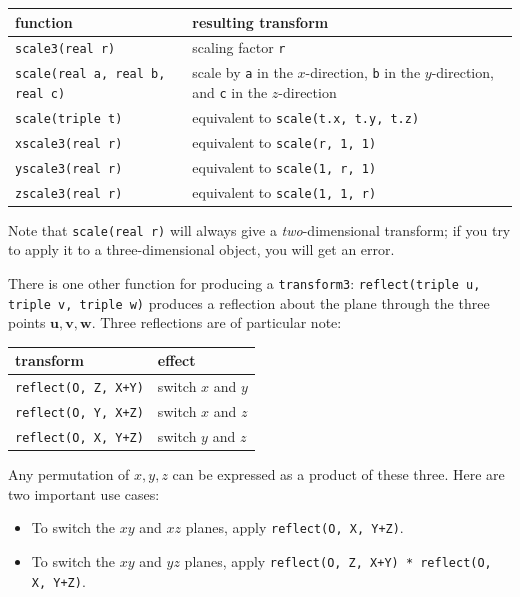 \documentclass{article}
\begin{document}
\begin{center}
\renewcommand{\arraystretch}{1.3}
\begin{tabular}{@{}p{4.2cm} p{5.4cm}@{}} \toprule
function & resulting transform \\ \midrule
\lstinline!scale3(real r)! & scaling factor \texttt{r} \\
\lstinline!scale(real a, real b, real c)! & scale by \texttt{a} in the $x$-direction, \texttt{b} in the $y$-direction, and 
\texttt{c} in the $z$-direction \\
\lstinline!scale(triple t)! & equivalent to \lstinline!scale(t.x, t.y, t.z)! \\
\lstinline!xscale3(real r)! & equivalent to \lstinline!scale(r, 1, 1)! \\
\lstinline!yscale3(real r)! & equivalent to \lstinline!scale(1, r, 1)! \\
\lstinline!zscale3(real r)! & equivalent to \lstinline!scale(1, 1, r)! \\
\bottomrule
\end{tabular}
\end{center}

\noindent
Note that \lstinline!scale(real r)! will always give a \emph{two}-dimensional transform;
if you try to apply it to a three-dimensional object, you will get an error.

There is one other function for producing a \lstinline!transform3!: 
\lstinline!reflect(triple u, triple v, triple w)! produces a reflection about the
plane through the three points $\mathbf{u}, \mathbf{v}, \mathbf{w}$.
Three reflections are of particular note:
\begin{center}
\renewcommand{\arraystretch}{1.3}
\begin{tabular}{@{}p{4.2cm} p{5.4cm}@{}} \toprule
transform & effect \\ \midrule
\lstinline!reflect(O, Z, X+Y)! & switch $x$ and $y$ \\
\lstinline!reflect(O, Y, X+Z)! & switch $x$ and $z$ \\
\lstinline!reflect(O, X, Y+Z)! & switch $y$ and $z$
\end{tabular}
\end{center}

Any permutation of $x, y, z$ can be expressed as a product of these three.
Here are two important use cases:\label{switchplanes}
\begin{itemize}
\item To switch the $xy$ and $xz$ planes, apply \lstinline!reflect(O, X, Y+Z)!.
\item To switch the $xy$ and $yz$ planes, apply 
\lstinline!reflect(O, Z, X+Y) * reflect(O, X, Y+Z)!.
\end{itemize}
\end{document}
